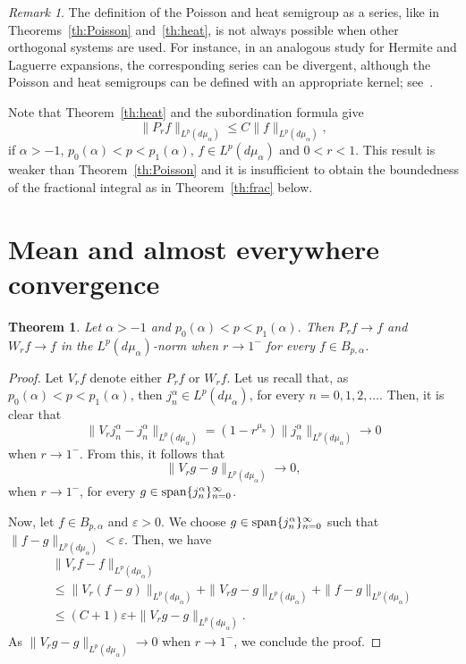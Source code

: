 \documentclass[11pt,a4paper]{amsart}
\newcommand{\mua}{d\mu_\alpha}
\newcommand{\jna}{j_n^{\alpha}}
\newcommand{\spa}{\operatornamewithlimits{span}} %
\newcommand{\lpnorm}[3]{\|{#1}\|_{L^{#2}({#3})}} %
\theoremstyle{plain}
\newtheorem{theor}{Theorem}
\theoremstyle{remark}
\newtheorem*{rem}{Remark}
\begin{document}
\begin{rem}
The definition of the Poisson and heat semigroup as a series, like
in Theorems~\ref{th:Poisson} and~\ref{th:heat}, is not always possible when
other orthogonal systems are used. For instance, in an analogous study
for Hermite and Laguerre expansions, the corresponding series can be divergent,
although the Poisson and heat semigroups can be defined with an appropriate kernel; see~\cite[Lemmas~2 and~4]{Mu}.
\end{rem}

Note that Theorem~\ref{th:heat} and the subordination formula give
\[
   \| P_r f \|_{L^p(d\mu_\alpha)} \le C\| f \|_{L^p(d\mu_\alpha)},
\]
if $\alpha>-1$, $p_0(\alpha) < p < p_1(\alpha)$, $f\in L^p(d\mu_\alpha)$ and
$0<r<1$. This result is weaker than Theorem~\ref{th:Poisson} and it is insufficient to obtain the boundedness of the fractional integral as in Theorem~\ref{th:frac} below.

\section{Mean and almost everywhere convergence}

\begin{theor}
\label{th:convLpVr}
Let $\alpha > -1$ and $p_0(\alpha) < p< p_1(\alpha)$. Then
$P_r f \to f$ and $W_r f \to f$ in the $L^p(\mua)$-norm when
$r \to 1^-$ for every $f \in B_{p,\alpha}$.
\end{theor}

\begin{proof}
Let $V_rf$ denote either $P_r f$ or $W_r f$. Let us recall that, as
$p_0(\alpha) < p< p_1(\alpha)$, then $\jna \in L^p(\mua)$, for every $n = 0, 1,2, \dots$. Then, it is clear that
\[
  \lpnorm{V_r\jna - \jna}{p}{\mua} = (1-r^{\mu_n})\lpnorm{\jna}{p}{\mua} \to 0
\]
when $r\to 1^-$. From this, it follows that 
\[
  \lpnorm{V_rg-g}{p}{\mua} \to 0,
\]
when $r\to 1^-$, for every $g\in \spa\{\jna\}_{n=0}^\infty$.

Now, let $f\in B_{p,\alpha}$ and $\varepsilon>0$.  We choose $g\in \spa\{\jna\}_{n=0}^\infty$ such that $\lpnorm{f-g}{p}{\mua} < \varepsilon$.
Then, we have
\begin{multline*}
  \lpnorm{V_rf-f}{p}{\mua} \\
  \le \lpnorm{V_r(f-g)}{p}{\mua} + \lpnorm{V_rg-g}{p}{\mua}
    + \lpnorm{f-g}{p}{\mua} \\
  \le (C+1)\varepsilon + \lpnorm{V_rg-g}{p}{\mua}.
\end{multline*}
As $\lpnorm{V_rg-g}{p}{\mua} \to 0$ when $r\to 1^-$, we conclude the proof.
\end{proof}
\end{document}
